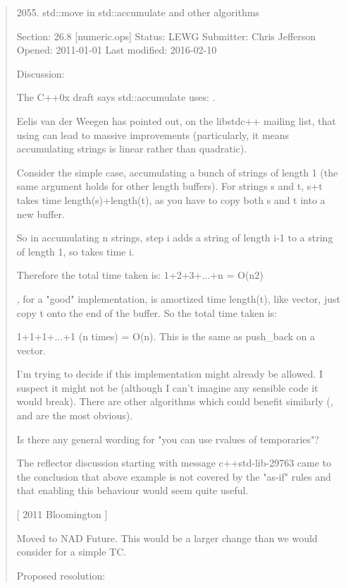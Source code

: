 \documentclass[ebook,11pt,article]{memoir}
\begin{document}
\begin{quote}
2055. std::move in std::accumulate and other algorithms

Section: 26.8 [numeric.ops] Status: LEWG Submitter: Chris Jefferson Opened: 2011-01-01 Last modified: 2016-02-10

Discussion:

The C++0x draft says std::accumulate uses: .

Eelis van der Weegen has pointed out, on the libstdc++ mailing list, that using  can lead to massive improvements (particularly, it means accumulating strings is linear rather than quadratic).

Consider the simple case, accumulating a bunch of strings of length 1 (the same argument holds for other length buffers). For strings s and t, s+t takes time length(s)+length(t), as you have to copy both s and t into a new buffer.

So in accumulating n strings, step i adds a string of length i-1 to a string of length 1, so takes time i.

Therefore the total time taken is: 1+2+3+...+n = O(n2)

, for a "good" implementation, is amortized time length(t), like vector, just copy t onto the end of the buffer. So the total time taken is:

1+1+1+...+1 (n times) = O(n). This is the same as push_back on a vector.

I'm trying to decide if this implementation might already be allowed. I suspect it might not be (although I can't imagine any sensible code it would break). There are other algorithms which could benefit similarly (,  and  are the most obvious).

Is there any general wording for "you can use rvalues of temporaries"?

The reflector discussion starting with message c++std-lib-29763 came to the conclusion that above example is not covered by the "as-if" rules and that enabling this behaviour would seem quite useful.

[ 2011 Bloomington ]

Moved to NAD Future. This would be a larger change than we would consider for a simple TC.

Proposed resolution:
\end{quote}
\end{document}
